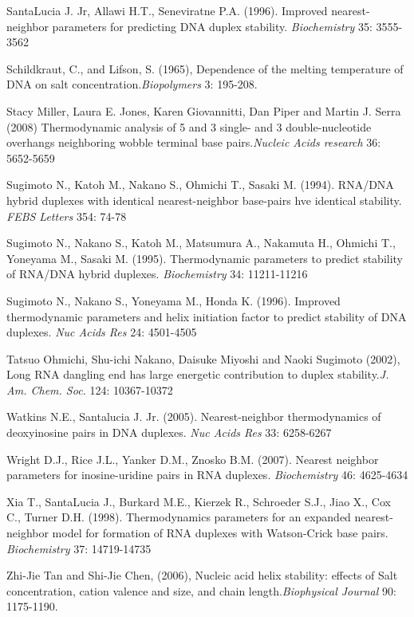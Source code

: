 \documentclass{article}
\begin{document}
  SantaLucia J. Jr, Allawi H.T., Seneviratne P.A. (1996). Improved 
nearest-neighbor parameters for predicting DNA duplex stability. \textit{Biochemistry} 
35: 3555-3562  

Schildkraut, C., and Lifson, S. (1965), Dependence of the melting temperature of DNA on 
salt concentration.\textit{Biopolymers} 3: 195-208.

Stacy Miller, Laura E. Jones, Karen Giovannitti, Dan Piper and Martin J. Serra (2008)
Thermodynamic analysis of 5 and 3 single- and 3 double-nucleotide overhangs 
neighboring wobble terminal base pairs.\textit{Nucleic Acids research}  36: 5652-5659  

  Sugimoto N., Katoh M., Nakano S., Ohmichi T., Sasaki M. (1994). 
RNA/DNA hybrid duplexes with identical nearest-neighbor base-pairs hve identical 
stability. \textit{FEBS Letters} 354: 74-78   

  Sugimoto N., Nakano S., Katoh M., Matsumura 
A., Nakamuta H., Ohmichi T., Yoneyama M., Sasaki M. (1995). Thermodynamic parameters 
to predict stability of RNA/DNA hybrid duplexes. \textit{Biochemistry} 34: 11211-11216 
  
  Sugimoto N., Nakano S., Yoneyama M., Honda K. (1996).  Improved thermodynamic 
parameters and helix initiation factor to predict stability of DNA duplexes. 
\textit{Nuc Acids Res}  24: 4501-4505  

Tatsuo Ohmichi, Shu-ichi Nakano, Daisuke Miyoshi and Naoki Sugimoto (2002), Long RNA dangling
end has large energetic contribution to duplex stability.\textit{J. Am. Chem. Soc.}
124: 10367-10372

Watkins N.E., Santalucia J. Jr. (2005). Nearest-neighbor thermodynamics of deoxyinosine 
pairs in DNA duplexes. \textit{Nuc Acids Res} 33: 6258-6267 

Wright D.J., Rice J.L., Yanker D.M., Znosko B.M. (2007). Nearest neighbor parameters for 
inosine-uridine pairs in RNA duplexes. \textit{Biochemistry} 46: 4625-4634

  Xia T., SantaLucia J., Burkard M.E., Kierzek 
R., Schroeder S.J., Jiao X., Cox C., Turner D.H. (1998). Thermodynamics parameters 
for an expanded nearest-neighbor model for formation of RNA duplexes with 
Watson-Crick base pairs. \textit{Biochemistry}  37: 14719-14735  

Zhi-Jie Tan and Shi-Jie Chen, (2006), Nucleic acid helix stability: effects of Salt 
concentration, cation valence and size, and chain length.\textit{Biophysical Journal}
90: 1175-1190. 
\end{document}
